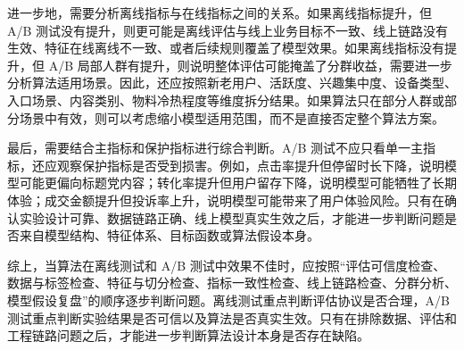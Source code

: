 \documentclass[UTF8]{ctexart}
\begin{document}
进一步地，需要分析离线指标与在线指标之间的关系。如果离线指标提升，但 A/B 测试没有提升，则更可能是离线评估与线上业务目标不一致、线上链路没有生效、特征在线离线不一致、或者后续规则覆盖了模型效果。如果离线指标没有提升，但 A/B 局部人群有提升，则说明整体评估可能掩盖了分群收益，需要进一步分析算法适用场景。因此，还应按照新老用户、活跃度、兴趣集中度、设备类型、入口场景、内容类别、物料冷热程度等维度拆分结果。如果算法只在部分人群或部分场景中有效，则可以考虑缩小模型适用范围，而不是直接否定整个算法方案。

最后，需要结合主指标和保护指标进行综合判断。A/B 测试不应只看单一主指标，还应观察保护指标是否受到损害。例如，点击率提升但停留时长下降，说明模型可能更偏向标题党内容；转化率提升但用户留存下降，说明模型可能牺牲了长期体验；成交金额提升但投诉率上升，说明模型可能带来了用户体验风险。只有在确认实验设计可靠、数据链路正确、线上模型真实生效之后，才能进一步判断问题是否来自模型结构、特征体系、目标函数或算法假设本身。

综上，当算法在离线测试和 A/B 测试中效果不佳时，应按照``评估可信度检查、数据与标签检查、特征与切分检查、指标一致性检查、线上链路检查、分群分析、模型假设复盘''的顺序逐步判断问题。离线测试重点判断评估协议是否合理，A/B 测试重点判断实验结果是否可信以及算法是否真实生效。只有在排除数据、评估和工程链路问题之后，才能进一步判断算法设计本身是否存在缺陷。
\end{document}
